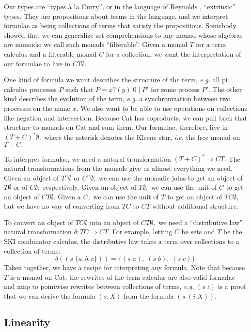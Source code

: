 \documentclass[]{acm_proc_article-sp}
\numberwithin{equation}{subsection}
\begin{document}
Our types are ``types \`a la Curry'', or in the language of Reynolds \cite{Reynolds}, ``extrinsic'' types.  They are propositions about terms in the language, and we interpret formulae as being collections of terms that satisfy the propositions.  Somebody \cite{whoever} showed that we can generalize set comprehensions to any monad whose algebras are monoids; we call such monads ``filterable''.  Given a monad $T$ for a term calculus and a filterable monad $C$ for a collection, we want the interpretation of our formulae to live in $CT\emptyset.$

One kind of formula we want describes the structure of the term, {\em e.g.} all pi calculus processes $P$ such that ${P = x?(y).0\; |\; P'}$ for some process $P'.$  The other kind describes the evolution of the term, {\em e.g.} a synchronization between two processes on the name $x$.  We also want to be able to use operations on collections like negation and intersection.  Because Cat has coproducts, we can pull back that structure to monads on Cat and sum them.  Our formulae, therefore, live in $(T + C)^*\emptyset,$ where the asterisk denotes the Kleene star, {\em i.e.} the free monad on $T + C.$

To interpret formulae, we need a natural transformation $(T + C)^* \Rightarrow CT.$  The natural transformations from the monads give us almost everything we need.  Given an object of $T^n\emptyset$ or $C^n\emptyset,$ we can use the monadic joins to get an object of $T\emptyset$ or of $C\emptyset,$ respectively.  Given an object of $T\emptyset,$ we can use the unit of $C$ to get an object of $CT\emptyset.$  Given a $C,$ we can use the unit of $T$ to get an object of $TC\emptyset,$ but we have no way of converting from $TC$ to $CT$ without additional structure.

To convert an object of $TC\emptyset$ into an object of $CT\emptyset,$ we need a ``distributive law'' natural transformation $\delta\colon TC \Rightarrow CT$.  For example, letting $C$ be sets and $T$ be the SKI combinator calculus, the distributive law takes a term over collections to a collection of terms:
\[\delta ((s\; \{a, b, c\})) = \{(s\; a),\; (s\; b),\; (s\; c)\}.\]
Taken together, we have a recipe for interpreting any formula.  Note that because $T$ is a monad on Cat, the rewrites of the term calculus are also valid formulae and map to pointwise rewrites between collections of terms, {\em e.g.} $(s\; \iota)$ is a proof that we can derive the formula $(s; X)$ from the formula $(s\; (i\; X)).$

\subsection{Linearity}
\end{document}
